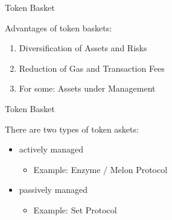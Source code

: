 \documentclass[handout]{beamer}
\begin{document}
\begin{frame}{Token Basket}

Advantages of token baskets:\\ \vspace{1em}

	\begin{enumerate}
		\item<1-> Diversification of Assets and Risks
		\item<2-> Reduction of Gas and Transaction Fees
		\item<3-> For some: Assets under Management
	\end{enumerate}
	
\end{frame}



\begin{frame}{Token Basket}
\vspace{1em}

There are two types of token askets: \vspace{1em}
	
	\begin{itemize}
		\item<1-> actively managed
		\begin{itemize}
			\item<1->Example: Enzyme / Melon Protocol \cite{enzyme}
		\end{itemize}
		\vspace{1em}
		\item<2-> passively managed
		\begin{itemize}
			\item<2->Example: Set Protocol \cite{set}
		\end{itemize}
	\end{itemize}
	
\end{frame}
\end{document}
